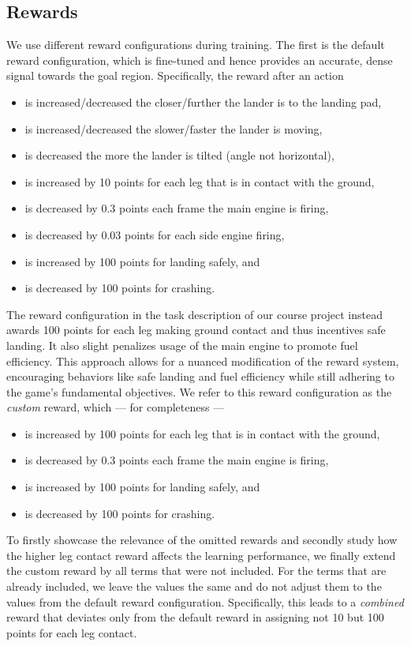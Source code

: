 \documentclass[a4paper, 11pt]{article}
\begin{document}
	\subsection{Rewards}
	We use different reward configurations during training. The first is the default reward configuration, which is fine-tuned and hence provides an accurate, dense signal towards the goal region. Specifically, the reward after an action
	\begin{itemize}
	\item is increased/decreased the closer/further the lander is to the landing pad,
	\item is increased/decreased the slower/faster the lander is moving,
	\item is decreased the more the lander is tilted (angle not horizontal),
	\item is increased by 10 points for each leg that is in contact with the ground,
	\item is decreased by 0.3 points each frame the main engine is firing,
	\item is decreased by 0.03 points for each side engine firing,
	\item is increased by 100 points for landing safely, and
	\item is decreased by 100 points for crashing.
	\end{itemize}
	The reward configuration in the task description of our course project instead awards 100 points for each leg making ground contact and thus incentives safe landing. It also slight penalizes usage of the main engine to promote fuel efficiency. This approach allows for a nuanced modification of the reward system, encouraging behaviors like safe landing and fuel efficiency while still adhering to the game's fundamental objectives.
	We refer to this reward configuration as the \textit{custom} reward, which --- for completeness ---
	\begin{itemize}
	\item is increased by 100 points for each leg that is in contact with the ground,
	\item is decreased by 0.3 points each frame the main engine is firing,
	\item is increased by 100 points for landing safely, and
	\item is decreased by 100 points for crashing.
	\end{itemize}
	
	To firstly showcase the relevance of the omitted rewards and secondly study how the higher leg contact reward affects the learning performance, we finally extend the custom reward by all terms that were not included. For the terms that are already included, we leave the values the same and do not adjust them to the values from the default reward configuration. Specifically, this leads to a \textit{combined} reward that deviates only from the default reward in assigning not 10 but 100 points for each leg contact.
\end{document}
